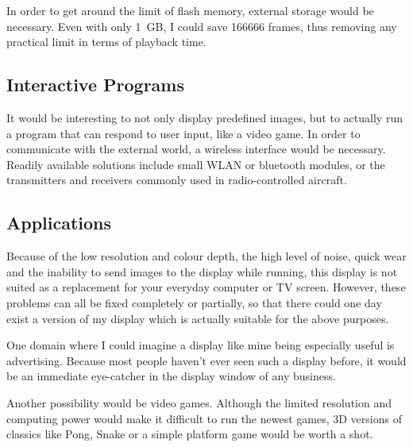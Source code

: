 \documentclass[a4paper, 11pt, titlepage]{report}
\begin{document}
In order to get around the limit of flash memory, external storage would be necessary. Even with
only \SI{1}{GB}, I could save 166666 frames, thus removing any practical limit in terms of
playback time.

\subsection{Interactive Programs}

It would be interesting to not only display predefined images, but to actually run a program that
can respond to user input, like a video game. In order to communicate with the external world, a
wireless interface would be necessary. Readily available solutions include small WLAN or bluetooth
modules, or the transmitters and receivers commonly used in radio-controlled aircraft.

\subsection{Applications}

Because of the low resolution and colour depth, the high level of noise, quick wear and the
inability to send images to the display while running, this display is not suited as a replacement
for your everyday computer or TV screen. However, these problems can all be fixed completely or
partially, so that there could one day exist a version of my display which is actually suitable
for the above purposes.

One domain where I could imagine a display like mine being especially useful is advertising.
Because most people haven't ever seen such a display before, it would be an immediate eye-catcher
in the display window of any business.

Another possibility would be video games. Although the limited resolution and computing power
would make it difficult to run the newest games, 3D versions of classics like Pong, Snake or a
simple platform game would be worth a shot.
\end{document}

